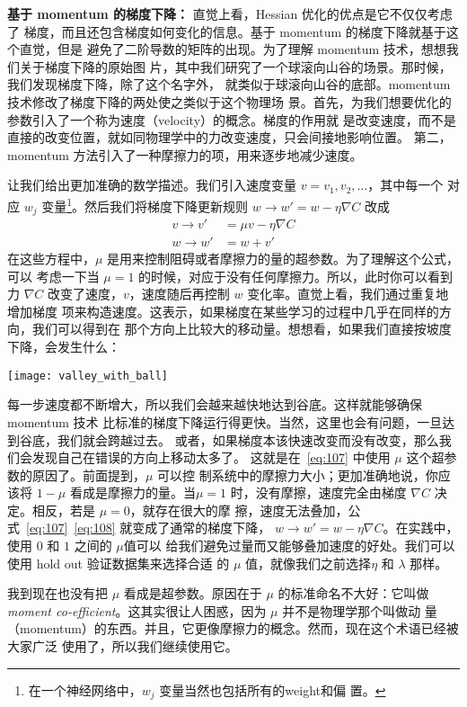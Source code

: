 \textbf{基于 momentum 的梯度下降：} 直觉上看，Hessian 优化的优点是它不仅仅考虑了
梯度，而且还包含梯度如何变化的信息。基于 momentum 的梯度下降就基于这个直觉，但是
避免了二阶导数的矩阵的出现。为了理解 momentum 技术，想想我们关于梯度下降的原始图
片，其中我们研究了一个球滚向山谷的场景。那时候，我们发现梯度下降，除了这个名字外，
就类似于球滚向山谷的底部。momentum 技术修改了梯度下降的两处使之类似于这个物理场
景。首先，为我们想要优化的参数引入了一个称为速度（velocity）的概念。梯度的作用就
是改变速度，而不是直接的改变位置，就如同物理学中的力改变速度，只会间接地影响位置。
第二，momentum 方法引入了一种摩擦力的项，用来逐步地减少速度。

让我们给出更加准确的数学描述。我们引入速度变量 $v = v_1, v_2, \ldots$，其中每一个
对应 $w_j$ 变量\footnote{在一个神经网络中，$w_j$ 变量当然也包括所有的\gls*{weight}和偏
  置。}。然后我们将梯度下降更新规则 $w\rightarrow w'=w-\eta\nabla C$ 改成
\begin{align} 
  v \rightarrow v' &= \mu v - \eta \nabla C \label{eq:107}\tag{107}\\
  w \rightarrow w' &= w+v' \label{eq:108}\tag{108}
\end{align}
在这些方程中，$\mu$ 是用来控制阻碍或者摩擦力的量的超参数。为了理解这个公式，可以
考虑一下当 $\mu=1$ 的时候，对应于没有任何摩擦力。所以，此时你可以看到力 $\nabla
C$ 改变了速度，$v$，速度随后再控制 $w$ 变化率。直觉上看，我们通过重复地增加梯度
项来构造速度。这表示，如果梯度在某些学习的过程中几乎在同样的方向，我们可以得到在
那个方向上比较大的移动量。想想看，如果我们直接按坡度下降，会发生什么：
\begin{center}
  \texttt{[image: valley\_with\_ball]}
\end{center}

每一步速度都不断增大，所以我们会越来越快地达到谷底。这样就能够确保 momentum 技术
比标准的梯度下降运行得更快。当然，这里也会有问题，一旦达到谷底，我们就会跨越过去。
或者，如果梯度本该快速改变而没有改变，那么我们会发现自己在错误的方向上移动太多了。
这就是在~\eqref{eq:107} 中使用 $\mu$ 这个超参数的原因了。前面提到，$\mu$ 可以控
制系统中的摩擦力大小；更加准确地说，你应该将 $1-\mu$ 看成是摩擦力的量。当$\mu=1$
时，没有摩擦，速度完全由梯度 $\nabla C$ 决定。相反，若是 $\mu=0$，就存在很大的摩
擦，速度无法叠加，公式~\eqref{eq:107}~\eqref{eq:108} 就变成了通常的梯度下降，
$w\rightarrow w'=w-\eta \nabla C$。在实践中，使用 $0$ 和 $1$ 之间的 $\mu$值可以
给我们避免过量而又能够叠加速度的好处。我们可以使用 hold out 验证数据集来选择合适
的 $\mu$ 值，就像我们之前选择$\eta$ 和 $\lambda$ 那样。

我到现在也没有把 $\mu$ 看成是超参数。原因在于 $\mu$ 的标准命名不大好：它叫做
\emph{moment co-efficient}。这其实很让人困惑，因为 $\mu$ 并不是物理学那个叫做动
量（momentum）的东西。并且，它更像摩擦力的概念。然而，现在这个术语已经被大家广泛
使用了，所以我们继续使用它。

